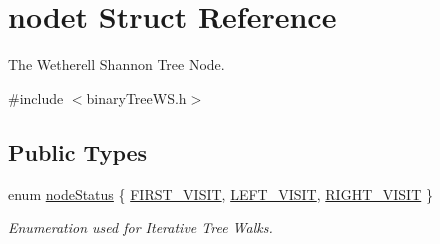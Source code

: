 \hypertarget{structnodet}{}\section{nodet Struct Reference}
\label{structnodet}


The Wetherell Shannon Tree Node.  




{\ttfamily \#include $<$binary\+Tree\+W\+S.\+h$>$}

\subsection*{Public Types}
\begin{DoxyCompactItemize}
\item 
enum \hyperlink{structnodet_aab296cc56fa34a05b7d9d632a9ddef2a}{node\+Status} \{ \hyperlink{structnodet_aab296cc56fa34a05b7d9d632a9ddef2aa06e3b7a26e3c03ded9d4cdc0eed59c89}{F\+I\+R\+S\+T\+\_\+\+V\+I\+S\+IT}, 
\hyperlink{structnodet_aab296cc56fa34a05b7d9d632a9ddef2aa66d47edf0c9c518208ba4418992a2423}{L\+E\+F\+T\+\_\+\+V\+I\+S\+IT}, 
\hyperlink{structnodet_aab296cc56fa34a05b7d9d632a9ddef2aa27c051da4e0422f702020cee7406b441}{R\+I\+G\+H\+T\+\_\+\+V\+I\+S\+IT}
 \}\begin{DoxyCompactList}\small\item\em Enumeration used for Iterative Tree Walks. \end{DoxyCompactList}
\end{DoxyCompactItemize}
